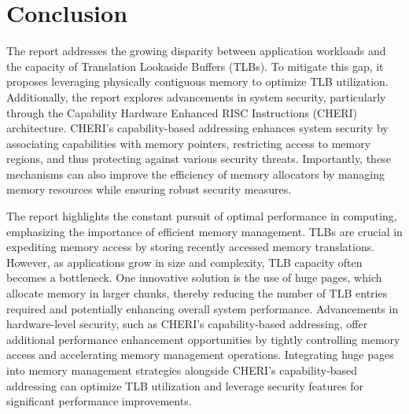 
\chapter{Conclusion}  %
The report addresses the growing disparity between application workloads and the capacity of Translation Lookaside Buffers (TLBs). 
To mitigate this gap, it proposes leveraging physically contiguous memory to optimize TLB utilization. Additionally, 
the report explores advancements in system security, particularly through the Capability Hardware Enhanced RISC Instructions (CHERI) 
architecture. CHERI's capability-based addressing enhances system security by associating capabilities with memory pointers, 
restricting access to memory regions, and thus protecting against various security threats. Importantly, these mechanisms 
can also improve the efficiency of memory allocators by managing memory resources while ensuring robust security measures.
\newline

The report highlights the constant pursuit of optimal performance in computing, emphasizing the importance of 
efficient memory management. TLBs are crucial in expediting memory access by storing recently accessed memory translations. 
However, as applications grow in size and complexity, TLB capacity often becomes a bottleneck. One innovative solution 
is the use of huge pages, which allocate memory in larger chunks, thereby reducing the number of TLB entries required 
and potentially enhancing overall system performance. Advancements in hardware-level security, such as CHERI's 
capability-based addressing, offer additional performance enhancement opportunities by tightly controlling memory 
access and accelerating memory management operations. Integrating huge pages into memory management strategies 
alongside CHERI's capability-based addressing can optimize TLB utilization and leverage security features for 
significant performance improvements.
\newline

